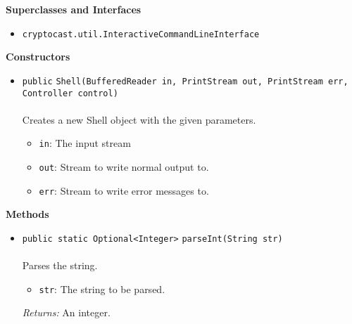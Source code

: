 \textbf{\sffamily Superclasses and Interfaces}
\begin{itemize}
\item \lstinline|cryptocast.util.InteractiveCommandLineInterface|
\end{itemize}


\textbf{\sffamily Constructors}
\begin{itemize}
\item \lstinline|public| \lstinline|Shell|\lstinline|(BufferedReader in, PrintStream out, PrintStream err, Controller control)|\\ \\[-0.6em]
Creates a new Shell object with the given parameters.
\begin{itemize}
\item \lstinline|in|: The input stream
\item \lstinline|out|: Stream to write normal output to.
\item \lstinline|err|: Stream to write error messages to.
\end{itemize}



\end{itemize}


\textbf{\sffamily Methods}
\begin{itemize}
\item \lstinline|public static Optional<Integer>| \lstinline|parseInt|\lstinline|(String str)|\\ \\[-0.6em]
Parses the string.
\begin{itemize}
\item \lstinline|str|: The string to be parsed.
\end{itemize}

\emph{Returns:} An integer.

\end{itemize}

